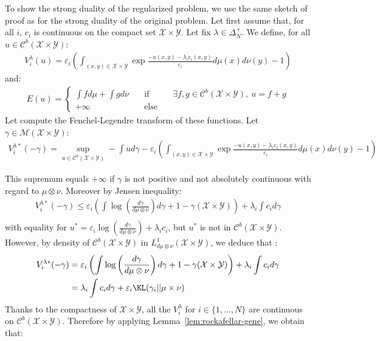 \begin{prv*}
To show the strong duality of the regularized problem, we use the same sketch of proof as for the strong duality of the original problem. 
\medskip
Let first assume that, for all $i$, $c_i$ is continuous on the compact set $\mathcal{X}\times\mathcal{Y}$. Let fix $\lambda\in\Delta_N^{+}$. We define, for all $u\in\mathcal{C}^b(\mathcal{X}\times\mathcal{Y})$:
\begin{align*}
    V^\lambda_i(u) = \varepsilon_i\left(\int_{(x,y)\in\mathcal{X}\times\mathcal{Y}} \exp{\frac{-u(x,y)-\lambda_ic_i(x,y)}{\varepsilon_i}}d\mu(x)d\nu(y)-1\right)
\end{align*}
and:
\begin{align*}
E(u)=\left\{\begin{matrix} \int fd\mu+\int gd\nu &\quad\text{if}\quad& \exists f,g\in \mathcal{C}^b(\mathcal{X}\times\mathcal{Y}),~ u = f+g\\
+\infty &\quad\text{else}\quad&\end{matrix}\right.
\end{align*}
Let compute the Fenchel-Legendre transform of these functions. Let $\gamma\in\mathcal{M}(\mathcal{X}\times\mathcal{Y})$:
\begin{align*}
    V^{\lambda*}_i(-\gamma) = \sup_{u\in\mathcal{C}^b(\mathcal{X}\times\mathcal{Y})}-\int ud\gamma -\varepsilon_i\left(\int_{(x,y)\in\mathcal{X}\times\mathcal{Y}} \exp{\frac{-u(x,y)-\lambda_ic_i(x,y)}{\varepsilon_i}}d\mu(x)d\nu(y)-1\right) 
\end{align*}

This supremum equals $+\infty$ if $\gamma$ is not positive and not absolutely continuous with regard to $\mu\otimes \nu$. Moreover by Jensen inequality:
\begin{align*}
V^{\lambda*}_i(-\gamma)\leq\varepsilon_i\left(\int \log\left(\frac{d\gamma}{d\mu\otimes\nu}\right)d\gamma +1- \gamma(\mathcal{X}\times\mathcal{Y})\right)+\lambda_i\int c_i d\gamma\\
\end{align*}
with equality for $u^*=\varepsilon_i \log\left(\frac{d\gamma}{d\mu\otimes\nu}\right)+\lambda_i c_i$, but  $u^*$ is not in $\mathcal{C}^b(\mathcal{X}\times\mathcal{Y})$. However, by density of $\mathcal{C}^b(\mathcal{X}\times\mathcal{Y})$ in $L^1_{d\mu\otimes\nu}(\mathcal{X}\times\mathcal{Y})$, we deduce that :
\begin{align*}
 V^{\lambda*}_i(-\gamma)&=\varepsilon_i\left(\int \log\left(\frac{d\gamma}{d\mu\otimes\nu}\right)d\gamma +1- \gamma(\mathcal{X}\times\mathcal{Y})\right)+\lambda_i\int c_i d\gamma\\
 &=\lambda_i\int c_id\gamma+\varepsilon_i\KL(\gamma_i||\mu\times\nu)
\end{align*}   
Thanks to the compactness of $\mathcal{X}\times\mathcal{Y}$, all the $V_i^{\lambda}$ for $i\in\{1,...,N\}$ are continuous on $\mathcal{C}^b(\mathcal{X}\times\mathcal{Y})$. Therefore by applying Lemma~\ref{lem:rockafellar-gene}, we obtain that:


\end{prv*}
